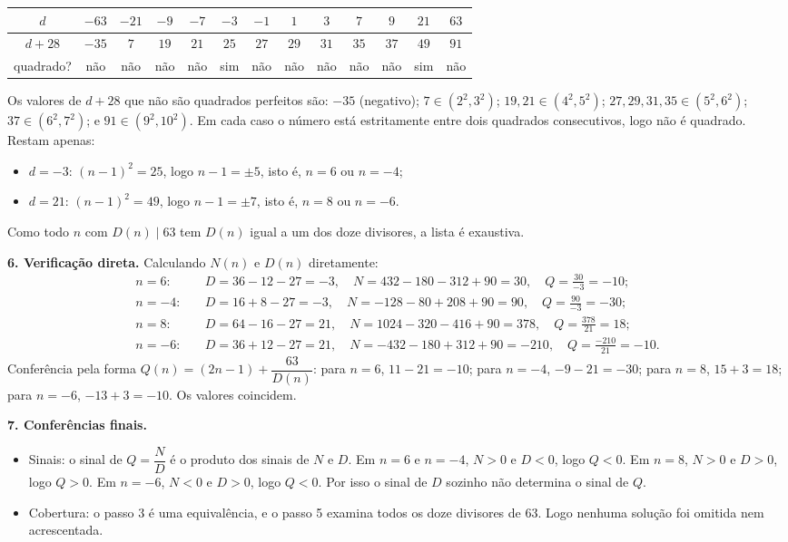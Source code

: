 \documentclass{article}%
\begin{document}
{\small
\begin{center}
\begin{tabular}{c|cccccccccccc}
$d$ & $-63$ & $-21$ & $-9$ & $-7$ & $-3$ & $-1$ & $1$ & $3$ & $7$ & $9$ & $21$ & $63$ \\ \hline
$d+28$ & $-35$ & $7$ & $19$ & $21$ & $25$ & $27$ & $29$ & $31$ & $35$ & $37$ & $49$ & $91$ \\ \hline
quadrado? & não & não & não & não & sim & não & não & não & não & não & sim & não
\end{tabular}
\end{center}
}

Os valores de $d+28$ que não são quadrados perfeitos são: $-35$ (negativo); $7\in(2^2,3^2)$; $19,21\in(4^2,5^2)$; $27,29,31,35\in(5^2,6^2)$; $37\in(6^2,7^2)$; e $91\in(9^2,10^2)$. Em cada caso o número está estritamente entre dois quadrados consecutivos, logo não é quadrado. Restam apenas:
\begin{itemize}
\item $d=-3$: $(n-1)^2=25$, logo $n-1=\pm 5$, isto é, $n=6$ ou $n=-4$;
\item $d=21$: $(n-1)^2=49$, logo $n-1=\pm 7$, isto é, $n=8$ ou $n=-6$.
\end{itemize}
Como todo $n$ com $D(n)\mid 63$ tem $D(n)$ igual a um dos doze divisores, a lista é exaustiva.

\textbf{6. Verificação direta.} Calculando $N(n)$ e $D(n)$ diretamente:
\begin{align*}
n=6:&\quad D=36-12-27=-3,\quad N=432-180-312+90=30,\quad Q=\frac{30}{-3}=-10;\\
n=-4:&\quad D=16+8-27=-3,\quad N=-128-80+208+90=90,\quad Q=\frac{90}{-3}=-30;\\
n=8:&\quad D=64-16-27=21,\quad N=1024-320-416+90=378,\quad Q=\frac{378}{21}=18;\\
n=-6:&\quad D=36+12-27=21,\quad N=-432-180+312+90=-210,\quad Q=\frac{-210}{21}=-10.
\end{align*}
Conferência pela forma $Q(n)=(2n-1)+\dfrac{63}{D(n)}$: para $n=6$, $11-21=-10$; para $n=-4$, $-9-21=-30$; para $n=8$, $15+3=18$; para $n=-6$, $-13+3=-10$. Os valores coincidem.

\textbf{7. Conferências finais.}
\begin{itemize}
\item Sinais: o sinal de $Q=\dfrac{N}{D}$ é o produto dos sinais de $N$ e $D$. Em $n=6$ e $n=-4$, $N>0$ e $D<0$, logo $Q<0$. Em $n=8$, $N>0$ e $D>0$, logo $Q>0$. Em $n=-6$, $N<0$ e $D>0$, logo $Q<0$. Por isso o sinal de $D$ sozinho não determina o sinal de $Q$.
\item Cobertura: o passo 3 é uma equivalência, e o passo 5 examina todos os doze divisores de $63$. Logo nenhuma solução foi omitida nem acrescentada.
\end{itemize}
\end{document}
